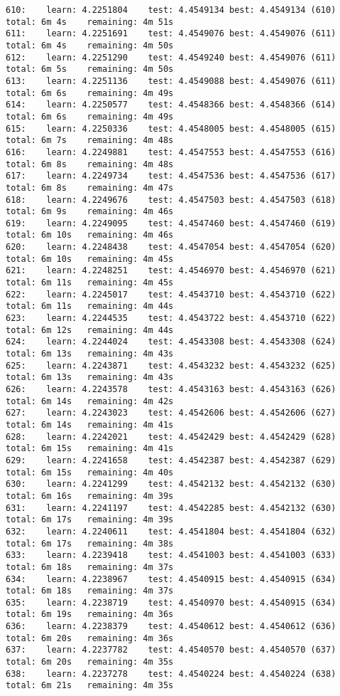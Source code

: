 \documentclass[11pt]{article}
\begin{document}
\begin{Verbatim}[commandchars=\\\{\}]
610:	learn: 4.2251804	test: 4.4549134	best: 4.4549134 (610)	total: 6m 4s	remaining: 4m 51s
611:	learn: 4.2251691	test: 4.4549076	best: 4.4549076 (611)	total: 6m 4s	remaining: 4m 50s
612:	learn: 4.2251290	test: 4.4549240	best: 4.4549076 (611)	total: 6m 5s	remaining: 4m 50s
613:	learn: 4.2251136	test: 4.4549088	best: 4.4549076 (611)	total: 6m 6s	remaining: 4m 49s
614:	learn: 4.2250577	test: 4.4548366	best: 4.4548366 (614)	total: 6m 6s	remaining: 4m 49s
615:	learn: 4.2250336	test: 4.4548005	best: 4.4548005 (615)	total: 6m 7s	remaining: 4m 48s
616:	learn: 4.2249881	test: 4.4547553	best: 4.4547553 (616)	total: 6m 8s	remaining: 4m 48s
617:	learn: 4.2249734	test: 4.4547536	best: 4.4547536 (617)	total: 6m 8s	remaining: 4m 47s
618:	learn: 4.2249676	test: 4.4547503	best: 4.4547503 (618)	total: 6m 9s	remaining: 4m 46s
619:	learn: 4.2249095	test: 4.4547460	best: 4.4547460 (619)	total: 6m 10s	remaining: 4m 46s
620:	learn: 4.2248438	test: 4.4547054	best: 4.4547054 (620)	total: 6m 10s	remaining: 4m 45s
621:	learn: 4.2248251	test: 4.4546970	best: 4.4546970 (621)	total: 6m 11s	remaining: 4m 45s
622:	learn: 4.2245017	test: 4.4543710	best: 4.4543710 (622)	total: 6m 11s	remaining: 4m 44s
623:	learn: 4.2244535	test: 4.4543722	best: 4.4543710 (622)	total: 6m 12s	remaining: 4m 44s
624:	learn: 4.2244024	test: 4.4543308	best: 4.4543308 (624)	total: 6m 13s	remaining: 4m 43s
625:	learn: 4.2243871	test: 4.4543232	best: 4.4543232 (625)	total: 6m 13s	remaining: 4m 43s
626:	learn: 4.2243578	test: 4.4543163	best: 4.4543163 (626)	total: 6m 14s	remaining: 4m 42s
627:	learn: 4.2243023	test: 4.4542606	best: 4.4542606 (627)	total: 6m 14s	remaining: 4m 41s
628:	learn: 4.2242021	test: 4.4542429	best: 4.4542429 (628)	total: 6m 15s	remaining: 4m 41s
629:	learn: 4.2241658	test: 4.4542387	best: 4.4542387 (629)	total: 6m 15s	remaining: 4m 40s
630:	learn: 4.2241299	test: 4.4542132	best: 4.4542132 (630)	total: 6m 16s	remaining: 4m 39s
631:	learn: 4.2241197	test: 4.4542285	best: 4.4542132 (630)	total: 6m 17s	remaining: 4m 39s
632:	learn: 4.2240611	test: 4.4541804	best: 4.4541804 (632)	total: 6m 17s	remaining: 4m 38s
633:	learn: 4.2239418	test: 4.4541003	best: 4.4541003 (633)	total: 6m 18s	remaining: 4m 37s
634:	learn: 4.2238967	test: 4.4540915	best: 4.4540915 (634)	total: 6m 18s	remaining: 4m 37s
635:	learn: 4.2238719	test: 4.4540970	best: 4.4540915 (634)	total: 6m 19s	remaining: 4m 36s
636:	learn: 4.2238379	test: 4.4540612	best: 4.4540612 (636)	total: 6m 20s	remaining: 4m 36s
637:	learn: 4.2237782	test: 4.4540570	best: 4.4540570 (637)	total: 6m 20s	remaining: 4m 35s
638:	learn: 4.2237278	test: 4.4540224	best: 4.4540224 (638)	total: 6m 21s	remaining: 4m 35s

\end{Verbatim}
\end{document}
